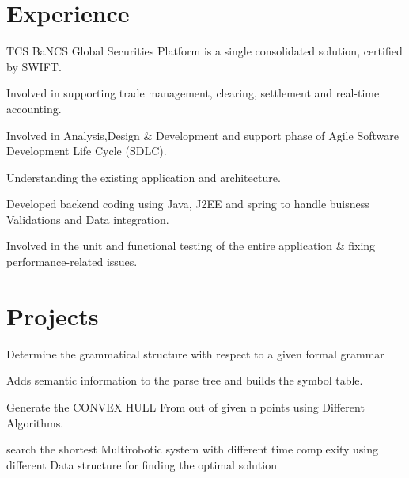 \documentclass[]{deedy-resume-openfont}
\begin{document}
\hfill
\begin{minipage}[t]{0.66\textwidth} 
\section{Experience}
\vspace{\topsep}
\vspace{\topsep}
\begin{tightemize}
\item TCS BaNCS Global Securities Platform is a single consolidated solution, certified by SWIFT.
\item Involved in supporting trade management, clearing, settlement and real-time accounting.
\item Involved in Analysis,Design \& Development and support phase of Agile Software Development Life Cycle (SDLC).
\item Understanding the existing application and architecture.
\item Developed backend coding using Java, J2EE and spring to handle buisness Validations and Data integration.
\item Involved in the unit and functional testing of the entire application \& fixing performance-related issues.
\end{tightemize} 

\sectionsep

\section{Projects}

\vspace{\topsep}
\vspace{\topsep}
\begin{tightemize}
\item Determine the grammatical structure with respect to a given formal grammar
\item Adds semantic information to the parse tree and builds the symbol table.
\end{tightemize}
\sectionsep

\vspace{\topsep} %
\begin{tightemize}
\item Generate the CONVEX HULL From out of given n points using Different
Algorithms. 
\item search the shortest Multirobotic system with different time complexity using
different Data structure for finding the optimal solution 


\end{tightemize}
\end{minipage}
\end{document}
